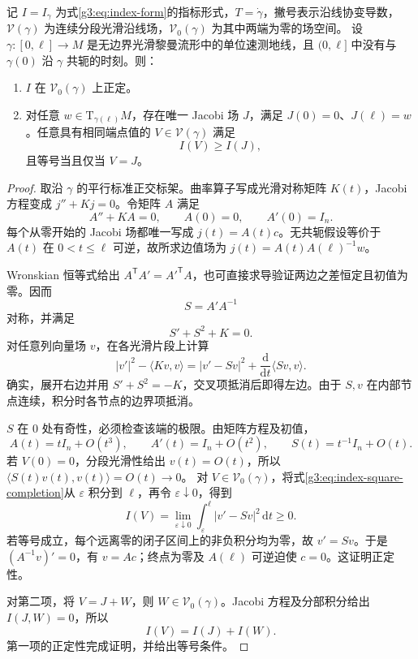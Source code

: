 \begin{theorem}\label{g3:thm:jacobi-index-lemma}
	记 \(I=I_\gamma\) 为式\eqref{g3:eq:index-form}的指标形式，\(T=\dot\gamma\)，撇号表示沿线协变导数，\(\mathcal V(\gamma)\) 为连续分段光滑沿线场，\(\mathcal V_0(\gamma)\) 为其中两端为零的场空间。
	设 \(\gamma:[0,\ell]\to M\) 是无边界光滑黎曼流形中的单位速测地线，且 \((0,\ell]\) 中没有与 \(\gamma(0)\) 沿 \(\gamma\) 共轭的时刻。则：
	\begin{enumerate}
		\item \(I\) 在 \(\mathcal V_0(\gamma)\) 上正定。
		\item 对任意 \(w\in\mathrm T_{\gamma(\ell)}M\)，存在唯一 Jacobi 场 \(J\)，满足 \(J(0)=0\)、\(J(\ell)=w\)。任意具有相同端点值的 \(V\in\mathcal V(\gamma)\) 满足
		\[
			I(V)\ge I(J),
		\]
		且等号当且仅当 \(V=J\)。
	\end{enumerate}
\end{theorem}
\begin{proof}
	取沿 \(\gamma\) 的平行标准正交标架。曲率算子写成光滑对称矩阵 \(K(t)\)，Jacobi 方程变成
	\(j''+Kj=0\)。令矩阵 \(A\) 满足
	\[
		A''+KA=0,\qquad A(0)=0,\qquad A'(0)=I_n.
	\]
	每个从零开始的 Jacobi 场都唯一写成 \(j(t)=A(t)c\)。无共轭假设等价于 \(A(t)\) 在 \(0<t\le\ell\) 可逆，故所求边值场为
	\(j(t)=A(t)A(\ell)^{-1}w\)。

	Wronskian 恒等式给出 \(A^{\mathsf T}A'=A'^{\mathsf T}A\)，也可直接求导验证两边之差恒定且初值为零。因而
	\[
		S=A'A^{-1}
	\]
	对称，并满足
	\[
		S'+S^2+K=0.
	\]
	对任意列向量场 \(v\)，在各光滑片段上计算
	\begin{equation}\label{g3:eq:index-square-completion}
		|v'|^2-\langle Kv,v\rangle
		=|v'-Sv|^2+\frac{\mathrm d}{\mathrm dt}\langle Sv,v\rangle.
	\end{equation}
	确实，展开右边并用 \(S'+S^2=-K\)，交叉项抵消后即得左边。由于 \(S,v\) 在内部节点连续，积分时各节点的边界项抵消。

	\(S\) 在 \(0\) 处有奇性，必须检查该端的极限。由矩阵方程及初值，
	\[
		A(t)=tI_n+O(t^3),\qquad
		A'(t)=I_n+O(t^2),\qquad
		S(t)=t^{-1}I_n+O(t).
	\]
	若 \(V(0)=0\)，分段光滑性给出 \(v(t)=O(t)\)，所以
	\(\langle S(t)v(t),v(t)\rangle=O(t)\to0\)。
	对 \(V\in\mathcal V_0(\gamma)\)，将式\eqref{g3:eq:index-square-completion}从 \(\varepsilon\) 积分到 \(\ell\)，再令 \(\varepsilon\downarrow0\)，得到
	\[
		I(V)=\lim_{\varepsilon\downarrow0}
		\int_\varepsilon^\ell|v'-Sv|^2\,\mathrm dt\ge0.
	\]
	若等号成立，每个远离零的闭子区间上的非负积分均为零，故 \(v'=Sv\)。于是
	\((A^{-1}v)'=0\)，有 \(v=Ac\)；终点为零及 \(A(\ell)\) 可逆迫使 \(c=0\)。这证明正定性。

	对第二项，将 \(V=J+W\)，则 \(W\in\mathcal V_0(\gamma)\)。Jacobi 方程及分部积分给出 \(I(J,W)=0\)，所以
	\[
		I(V)=I(J)+I(W).
	\]
	第一项的正定性完成证明，并给出等号条件。
\end{proof}

